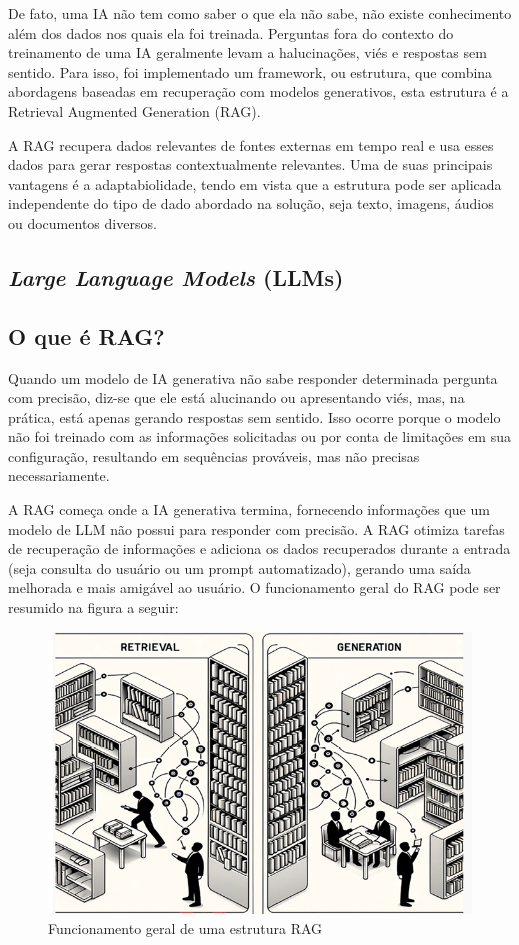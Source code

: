 \documentclass[a4paper, 12pt]{article}
\begin{document}
    De fato, uma IA não tem como saber o que ela não sabe, não existe conhecimento além dos dados nos quais ela foi treinada. Perguntas fora do contexto do treinamento de uma IA geralmente levam a halucinações, viés e respostas sem sentido. Para isso, foi implementado um framework, ou estrutura, que combina abordagens baseadas em recuperação com modelos generativos, esta estrutura é a Retrieval Augmented Generation (RAG).

    A RAG recupera dados relevantes de fontes externas em tempo real e usa esses dados para gerar respostas contextualmente relevantes. Uma de suas principais vantagens é a adaptabiolidade, tendo em vista que a estrutura pode ser aplicada independente do tipo de dado abordado na solução, seja texto, imagens, áudios ou documentos diversos.

    \subsection{\textit{Large Language Models} (LLMs)}
    \lipsum[1-2]

    \subsection{O que é RAG?}
    
    Quando um modelo de IA generativa não sabe responder determinada pergunta com precisão, diz-se que ele está alucinando ou apresentando viés, mas, na prática, está apenas gerando respostas sem sentido. Isso ocorre porque o modelo não foi treinado com as informações solicitadas ou por conta de limitações em sua configuração, resultando em sequências prováveis, mas não precisas necessariamente.

    A RAG começa onde a IA generativa termina, fornecendo informações que um modelo de LLM não possui para responder com precisão. A RAG otimiza tarefas de recuperação de informações e adiciona os dados recuperados durante a entrada (seja consulta do usuário ou um prompt automatizado), gerando uma saída melhorada e mais amigável ao usuário. O funcionamento geral do RAG pode ser resumido na figura a seguir:

    \begin{figure}[h]
        \includegraphics{retrieval-generation.png}
        \centering
        \caption{Funcionamento geral de uma estrutura RAG}
        \centering
    \end{figure}
\end{document}

